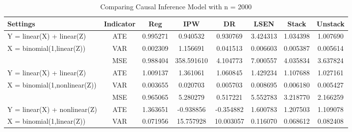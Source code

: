 \documentclass{elegantpaper}
\begin{document}
\begin{table}[H]
  \small
  \centering
  \caption{Comparing Causal Inference Model with n = 2000}
    \begin{tabular}{llllllll}
    \toprule
    Settings & \multicolumn{1}{c}{Indicator} &\multicolumn{1}{c}{Reg} & \multicolumn{1}{c}{IPW} & \multicolumn{1}{c}{DR} & \multicolumn{1}{c}{LSEN} & \multicolumn{1}{c}{Stack} & \multicolumn{1}{c}{Unstack}\\
   
    \midrule
    Y = linear(X) + linear(Z) & \multicolumn{1}{c}{ATE} & \multicolumn{1}{c}{0.995271} & \multicolumn{1}{c}{0.940532} & \multicolumn{1}{c}{0.930769} & \multicolumn{1}{c}{3.424313}& \multicolumn{1}{c}{1.034398} & \multicolumn{1}{c}{1.007690}\\
    X = binomial(1,linear(Z)) & \multicolumn{1}{c}{VAR} & \multicolumn{1}{c}{0.002309} & \multicolumn{1}{c}{1.156691} & \multicolumn{1}{c}{0.041513} & \multicolumn{1}{c}{0.006603}& \multicolumn{1}{c}{0.005387} & \multicolumn{1}{c}{0.005614}\\
        & \multicolumn{1}{c}{MSE} & \multicolumn{1}{c}{0.988404} & \multicolumn{1}{c}{358.591610} & \multicolumn{1}{c}{4.104773} & \multicolumn{1}{c}{ 7.000557}& \multicolumn{1}{c}{ 4.035834} & \multicolumn{1}{c}{3.637824}\\%
     \midrule              
     Y = linear(X) + linear(Z) & \multicolumn{1}{c}{ATE} & \multicolumn{1}{c}{1.009137} & \multicolumn{1}{c}{1.361061} & \multicolumn{1}{c}{1.060845} & \multicolumn{1}{c}{1.429234}& \multicolumn{1}{c}{1.107688} & \multicolumn{1}{c}{1.027161}\\
    X = binomial(1,nonlinear(Z)) & \multicolumn{1}{c}{VAR} & \multicolumn{1}{c}{0.003655} & \multicolumn{1}{c}{0.020703} & \multicolumn{1}{c}{0.005703} & \multicolumn{1}{c}{0.008695}& \multicolumn{1}{c}{0.006180} & \multicolumn{1}{c}{0.005427}\\
     & \multicolumn{1}{c}{MSE} & \multicolumn{1}{c}{0.965065} & \multicolumn{1}{c}{ 5.280279} & \multicolumn{1}{c}{0.517221} & \multicolumn{1}{c}{5.552783}& \multicolumn{1}{c}{ 3.218770} & \multicolumn{1}{c}{2.166259}\\%
    \midrule                
    Y = linear(X) + nonlinear(Z) & \multicolumn{1}{c}{ATE} & \multicolumn{1}{c}{1.363651} & \multicolumn{1}{c}{-0.938856} & \multicolumn{1}{c}{-0.354882} & \multicolumn{1}{c}{ 1.600783}& \multicolumn{1}{c}{1.207503} & \multicolumn{1}{c}{1.109078}\\
    X = binomial(1,linear(Z)) & \multicolumn{1}{c}{VAR} & \multicolumn{1}{c}{0.071956} & \multicolumn{1}{c}{15.757928} & \multicolumn{1}{c}{10.003057} & \multicolumn{1}{c}{0.116070}& \multicolumn{1}{c}{ 0.068612} & \multicolumn{1}{c}{0.082408}\\

\end{tabular}
\end{table}
\end{document}

